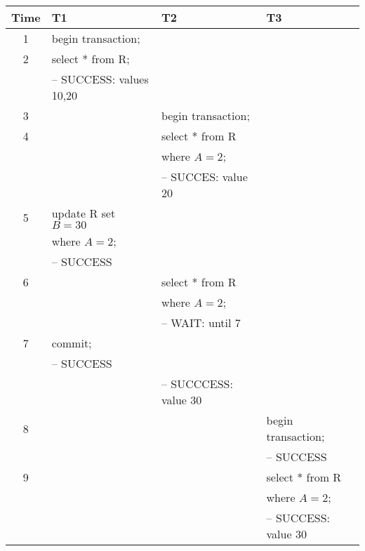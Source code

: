 \documentclass[addpoints,answers,12pt]{exam}
\begin{document}
\begin{questions}
\begin{parts}
\begin{subparts}
\begin{solution}
{\scriptsize
\begin{tabular}{|c|l|l|l|} \hline
  Time & T1 & T2 & T3 \\ \hline
1 & begin transaction;              &                    & \\ \hline
2 & select * from R;                &                    & \\
  & -- SUCCESS: values 10,20           &                    & \\ \hline
3 &                                 & begin transaction; & \\ \hline
4 &                                 & select * from R    & \\
  &                                 & where $A=2$;       & \\ 
  &                                 & -- SUCCES: value 20   & \\ \hline
5 & update R set $B=30$             &                    & \\
  & where $A=2$;                    &                    & \\
  & -- SUCCESS                         &                    & \\ \hline
6 &                                 &  select * from R   & \\
  &                                 &  where $A=2$;      & \\
  &                                 & -- WAIT: until 7   & \\ \hline
7 & commit;                         &                    & \\
  & -- SUCCESS                      &                    & \\
  &                                 & -- SUCCCESS: value 30 & \\ \hline
8 &                                 &                    & begin transaction; \\
  &                                 &                    & -- SUCCESS  \\ \hline
9 &                                 &                    & select * from R  \\
  &                                 &                    & where $A=2$; \\
  &                                 &                    & -- SUCCESS: value 30 \\ \hline

\end{tabular}}
\end{solution}
\end{subparts}
\end{parts}
\end{questions}
\end{document}
